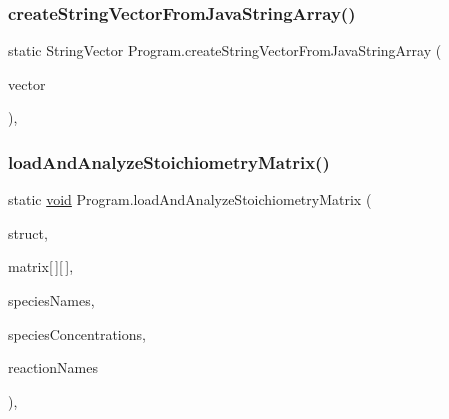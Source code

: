 \subsubsection{\texorpdfstring{create\+String\+Vector\+From\+Java\+String\+Array()}{createStringVectorFromJavaStringArray()}}
{\footnotesize\ttfamily static String\+Vector Program.\+create\+String\+Vector\+From\+Java\+String\+Array (\begin{DoxyParamCaption}\item[{String \mbox{[}$\,$\mbox{]}}]{vector }\end{DoxyParamCaption})\hspace{0.3cm}{\ttfamily [inline]}, {\ttfamily [static]}}

\mbox{\label{class_program_a3db171f711903dfb0eea2199ec5b87c4}} 
\subsubsection{\texorpdfstring{load\+And\+Analyze\+Stoichiometry\+Matrix()}{loadAndAnalyzeStoichiometryMatrix()}}
{\footnotesize\ttfamily static \hyperlink{lp__lib_8h_ac7828c7b2b31d2e11af17bdb6289c5d9}{void} Program.\+load\+And\+Analyze\+Stoichiometry\+Matrix (\begin{DoxyParamCaption}\item[{Lib\+Structural}]{struct,  }\item[{double}]{matrix\mbox{[}$\,$\mbox{]}\mbox{[}$\,$\mbox{]},  }\item[{String \mbox{[}$\,$\mbox{]}}]{species\+Names,  }\item[{double \mbox{[}$\,$\mbox{]}}]{species\+Concentrations,  }\item[{String \mbox{[}$\,$\mbox{]}}]{reaction\+Names }\end{DoxyParamCaption})\hspace{0.3cm}{\ttfamily [inline]}, {\ttfamily [static]}}

\mbox{\label{class_program_a4020c05ba0a5821c7a1e4699baec2560}} 
